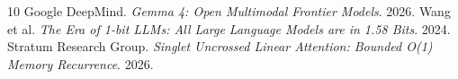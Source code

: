 \documentclass[11pt,a4paper]{article}
\begin{document}

\begin{thebibliography}{10}
 Google DeepMind. \emph{Gemma 4: Open Multimodal Frontier Models}. 2026.
 Wang et al. \emph{The Era of 1-bit LLMs: All Large Language Models are in 1.58 Bits}. 2024.
 Stratum Research Group. \emph{Singlet Uncrossed Linear Attention: Bounded O(1) Memory Recurrence}. 2026.
\end{thebibliography}
\end{document}
